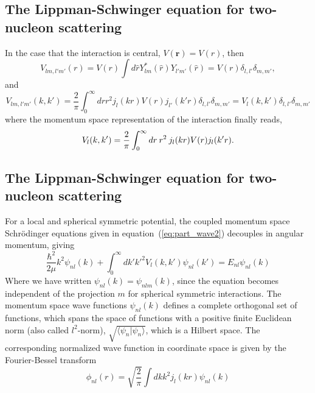 \documentclass[%
twoside,                 %
final,                   %
10pt]{article}
\begin{document}
\subsection{The Lippman-Schwinger equation for two-nucleon scattering}
\begin{block}{}
In the case that the interaction is central, $V(\mathbf{r}) = V(r)$, then
\begin{equation}
  V_{lm, l'm'}(r) = V(r) \int d{\hat{r}}Y_{lm}^*(\hat{r})Y_{l'm'}(\hat{r}) = V(r) \delta_{l,l'}\delta_{m,m'},
  \label{eq:pot7}
\end{equation}
and 
\begin{equation}
  V_{lm, l'm'}(k,k') = \frac{2}{\pi} \int_0^\infty drr^2j_l(kr) V(r) j_{l'}(k'r)\delta_{l,l'}\delta_{m,m'} = V_l(k,k') \delta_{l,l'}\delta_{m,m'}
  \label{eq:pot8}
\end{equation}
where the momentum space representation of the interaction finally reads,
\begin{equation}
  V_{l}(k,k') = {2 \over \pi} \int_0^\infty dr\: r^2 \:
  j_l(kr) V(r) j_{l}(k'r).
  \label{eq:pot9}
\end{equation}
\end{block}

\subsection{The Lippman-Schwinger equation for two-nucleon scattering}
\begin{block}{}
For a local and spherical symmetric potential, 
the coupled momentum space Schr\"odinger equations given in equation~(\ref{eq:part_wave2})
decouples in angular momentum, 
giving
\begin{equation}
\frac{\hbar^2}{2\mu} k^2 \psi_{n l}(k) +\int_{0}^\infty dk' {k'}^2 V_{l}(k,k') \psi_{n l }(k')=E_{n l} \psi_{n l}(k) 
  \label{eq:momentum_space}
\end{equation}   
Where we have written $\psi_{n l }(k)=\psi_{nlm}(k)$, since the 
equation becomes independent of the projection $m$ for spherical symmetric interactions. 
The momentum space wave functions $\psi_{n l}(k)$ defines a complete orthogonal set 
of functions, which spans the space of functions with a positive finite Euclidean norm 
 (also called $l^2$-norm), $\sqrt{\langle\psi_n\vert\psi_n\rangle}$, which 
is a Hilbert space. The corresponding normalized wave function in coordinate space
is given by the Fourier-Bessel transform 
\[
  \phi_{n l}(r)  = \sqrt{\frac{2}{\pi}}\int dk k^2 j_l(kr) \psi_{n l}(k)
\]    
\end{block}
\end{document}
